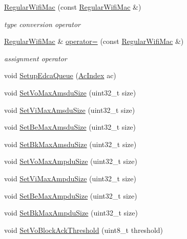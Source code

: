 \begin{DoxyCompactItemize}
\item 
\hyperlink{classns3_1_1RegularWifiMac_acce6e009d40bc60b54b6f5c47b42a943}{Regular\+Wifi\+Mac} (const \hyperlink{classns3_1_1RegularWifiMac}{Regular\+Wifi\+Mac} \&)
\begin{DoxyCompactList}\small\item\em type conversion operator \end{DoxyCompactList}\item 
\hyperlink{classns3_1_1RegularWifiMac}{Regular\+Wifi\+Mac} \& \hyperlink{classns3_1_1RegularWifiMac_ab88ad2949662cdccaa08dbb735989529}{operator=} (const \hyperlink{classns3_1_1RegularWifiMac}{Regular\+Wifi\+Mac} \&)
\begin{DoxyCompactList}\small\item\em assignment operator \end{DoxyCompactList}\item 
void \hyperlink{classns3_1_1RegularWifiMac_a4f5fd33ab92758cd2a117f57dd45eff1}{Setup\+Edca\+Queue} (\hyperlink{group__wifi_gab422b4562ba272b39a9b6bca3513f3ac}{Ac\+Index} ac)
\item 
void \hyperlink{classns3_1_1RegularWifiMac_a6a64881778387001fcf5bbcbd448e8d3}{Set\+Vo\+Max\+Amsdu\+Size} (uint32\+\_\+t size)
\item 
void \hyperlink{classns3_1_1RegularWifiMac_aa172bf782062d45db0fc21b8094e2ff5}{Set\+Vi\+Max\+Amsdu\+Size} (uint32\+\_\+t size)
\item 
void \hyperlink{classns3_1_1RegularWifiMac_a3447694323cd7a8c77ae2c6748e9b829}{Set\+Be\+Max\+Amsdu\+Size} (uint32\+\_\+t size)
\item 
void \hyperlink{classns3_1_1RegularWifiMac_a125bd1db09c527afa49572b9b5723532}{Set\+Bk\+Max\+Amsdu\+Size} (uint32\+\_\+t size)
\item 
void \hyperlink{classns3_1_1RegularWifiMac_aa3a33e97374743756cbc74517ba48cde}{Set\+Vo\+Max\+Ampdu\+Size} (uint32\+\_\+t size)
\item 
void \hyperlink{classns3_1_1RegularWifiMac_aa4dfc64775735da1f66c1bb92332577e}{Set\+Vi\+Max\+Ampdu\+Size} (uint32\+\_\+t size)
\item 
void \hyperlink{classns3_1_1RegularWifiMac_a6d5f26156429a50bda6120ca5cad4fa4}{Set\+Be\+Max\+Ampdu\+Size} (uint32\+\_\+t size)
\item 
void \hyperlink{classns3_1_1RegularWifiMac_af27091cca05caf74c4d53b60abd8d281}{Set\+Bk\+Max\+Ampdu\+Size} (uint32\+\_\+t size)
\item 
void \hyperlink{classns3_1_1RegularWifiMac_a57a6d060a150969619a9477a0ccbb49d}{Set\+Vo\+Block\+Ack\+Threshold} (uint8\+\_\+t threshold)

\end{DoxyCompactItemize}
